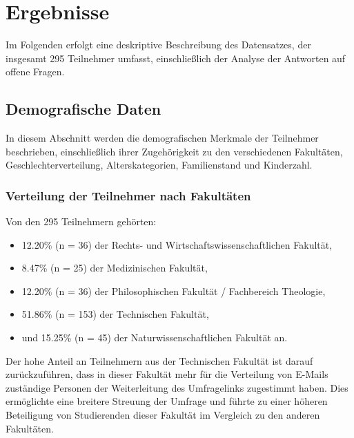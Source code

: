\documentclass[german,report]{i1thesis}
\begin{document}
\section{Ergebnisse}
\label{sec:results}

Im Folgenden erfolgt eine deskriptive Beschreibung des Datensatzes, der insgesamt 295 Teilnehmer umfasst, einschließlich der Analyse der Antworten auf offene Fragen.

\subsection{Demografische Daten}
\label{sec:demografische-daten}

In diesem Abschnitt werden die demografischen Merkmale der Teilnehmer beschrieben, einschließlich ihrer Zugehörigkeit zu den verschiedenen Fakultäten, Geschlechterverteilung, Alterskategorien, Familienstand und Kinderzahl.

\subsubsection{Verteilung der Teilnehmer nach Fakultäten}

Von den 295 Teilnehmern gehörten:
\begin{itemize}
    \item 12.20\% (n = 36) der Rechts- und Wirtschaftswissenschaftlichen Fakultät,
    \item 8.47\% (n = 25) der Medizinischen Fakultät,
    \item 12.20\% (n = 36) der Philosophischen Fakultät / Fachbereich Theologie,
    \item 51.86\% (n = 153) der Technischen Fakultät,
    \item und 15.25\% (n = 45) der Naturwissenschaftlichen Fakultät an.
\end{itemize}

Der hohe Anteil an Teilnehmern aus der Technischen Fakultät ist darauf zurückzuführen, dass in dieser Fakultät mehr für die Verteilung von E-Mails zuständige Personen der Weiterleitung des Umfragelinks zugestimmt haben. Dies ermöglichte eine breitere Streuung der Umfrage und führte zu einer höheren Beteiligung von Studierenden dieser Fakultät im Vergleich zu den anderen Fakultäten.
\end{document}
